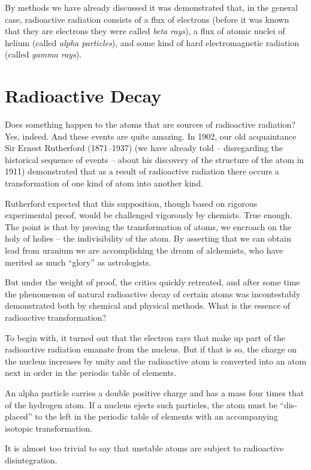 By methods we have already discussed it was demon­strated that, in the general case, radioactive radiation consists of a flux of electrons (before it was known that they are electrons they were called \emph{beta rays}), a flux of atomic nuclei of helium (called \emph{alpha particles}), and some kind of hard electromagnetic radiation (called \emph{gam­ma rays}).

\section{Radioactive Decay}
Does something happen to the atoms that are sources of radioactive radiation? Yes, indeed. And these events are quite amazing. In 1902, our old acquaintance Sir Ernest Rutherford (1871--1937) (we have already told -- disregard­ing the historical sequence of events -- about his discovery of the structure of the atom in 1911) demonstrated that as a result of radioactive radiation there occurs a transfor­mation of one kind of atom into another kind.

Rutherford expected that this supposition, though based on rigorous experimental proof, would be challenged vigorously by chemists. True enough. The point is that by proving the transformation of atoms, we encroach on the holy of holies -- the indivisibility of the atom. By asserting that we can obtain lead from uranium we are accomplishing the dream of alchemists, who have merited as much ``glory'' as astrologists.

But under the weight of proof, the critics quickly retreated, and after some time the phenomenon of natural radioactive decay of certain atoms was incontestably demonstrated both by chemical and physical methods. What is the essence of radioactive transformation?

To begin with, it turned out that the electron rays that make up part of the radioactive radiation emanate from the nucleus. But if that is so, the charge on the nucleus increases by unity and the radioactive atom is converted into an atom next in order in the periodic table of elements.

An alpha particle carries a double positive charge and has a mass four times that of the hydrogen atom. If a nucleus ejects such particles, the atom must be ``dis­placed'' to the left in the periodic table of elements with an accompanying isotopic transformation.

It is almost too trivial to say that unstable atoms are subject to radioactive disintegration.

